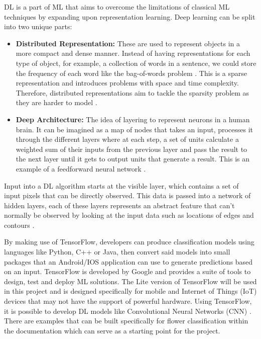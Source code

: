 \documentclass[12pt,a4paper]{report}
\begin{document}
\par

DL is a part of ML that aims to overcome the limitations of classical ML techniques 
by expanding upon representation learning. Deep learning can be split into two unique parts:

\begin{itemize}
    \item \textbf{Distributed Representation:} These are used to represent objects in a more compact and dense manner.
Instead of having representations for each type of object, for example, a collection of words in a sentence, we could 
store the frequency of each word like the bag-of-words problem \citep{liu2020representation}. This is a sparse
representation and introduces problems with space and time complexity. Therefore, distributed representations aim to 
tackle the sparsity problem as they are harder to model \citep{Brownlee2017}.
    \item \textbf{Deep Architecture:} The idea of layering to represent neurons in a human brain. It can be imagined 
    as a map of 
nodes that takes an input, processes it through the different layers where at each step, a set of units calculate a 
weighted sum of their inputs from the previous layer and pass the result to the next layer until it gets to output units
that generate a result. This is an example of a feedforward neural network \citep{lecun2015deep}.
\end{itemize}

\par

Input into a DL algorithm starts at the visible layer, which contains a set of input pixels that can be
directly observed. This data is passed into a network of hidden layers, each of these layers represents an abstract 
feature that can't normally be observed by looking at the input data such as locations of edges and contours 
\citep[p. 26]{goodfellow2016deep}.

\par

By making use of TensorFlow, developers can produce classification models using languages like Python, C++ or Java, then 
convert said models into small packages that an Android/IOS application can use to generate predictions based on an 
input. TensorFlow is developed by Google and provides a suite of tools to design, test and 
deploy ML solutions. The Lite version of TensorFlow will be used in this project and is designed specifically for mobile and Internet of 
Things (IoT) devices 
that may not have the support of powerful hardware. Using TensorFlow, it is possible to develop DL models like 
Convolutional Neural Networks (CNN) \citep{googleTF2}. 
There are examples that can be built specifically for flower classification within the documentation which can serve
as a starting point for the project.
\end{document}

